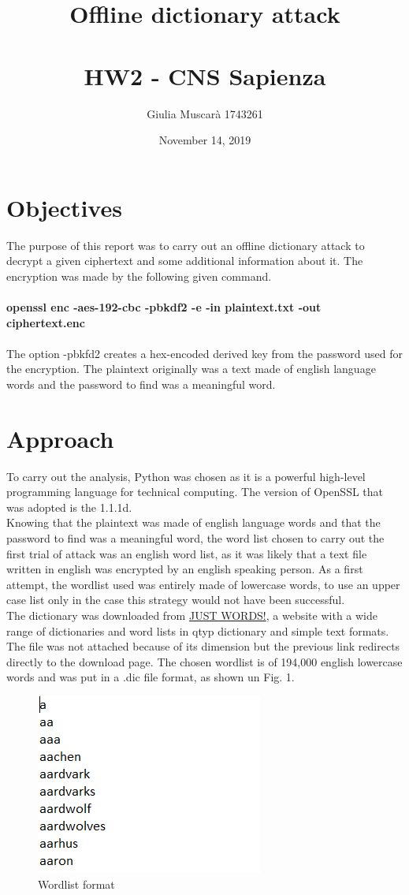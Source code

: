 \documentclass{article}
\title{Offline dictionary attack\\
	 \large \\ HW2 - CNS Sapienza}
\author{Giulia Muscarà 1743261}
\date{November 14, 2019}
\begin{document}
\maketitle

\section{Objectives}
The purpose of this report was to carry out an offline dictionary attack to decrypt a given ciphertext and some additional information about it. The encryption was made by the following given command. \\ \\
\textbf{openssl enc -aes-192-cbc -pbkdf2 -e -in plaintext.txt -out ciphertext.enc}\\ \\
The option -pbkfd2 creates a hex-encoded derived key from the password used for the encryption.
The plaintext originally was a text made of english language words and the password to find was a meaningful word.

\section{Approach}
To carry out the analysis, Python was chosen as it is a powerful high-level programming language for technical computing. The version of OpenSSL that was adopted is the 1.1.1d. \\ 
Knowing that the plaintext was made of english language words and that the password to find was a meaningful word, the word list chosen to carry out the first trial of attack was an english word list, as it was likely that a text file written in english was encrypted by an english speaking person.
As a first attempt, the wordlist used was entirely made of lowercase words, to use an upper case list only in the case this strategy would not have been successful. \\
The dictionary was downloaded from \href{http://www.gwicks.net/dictionaries.htm
}{JUST WORDS!}, a website with a wide range of dictionaries and word lists in qtyp dictionary and simple text formats. The file was not attached because of its dimension but the previous link redirects directly to the download page. The chosen wordlist is of 194,000 english lowercase words and was put in a .dic file format, as shown un Fig. 1.\\ 

\clearpage

\begin{figure}[t]
	\includegraphics{img1-hw2-1743261.png}
	\caption{Wordlist format}
\end{figure}
\end{document}
